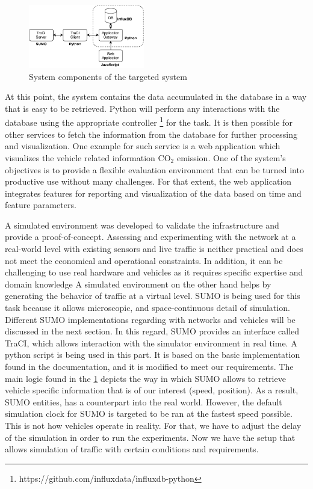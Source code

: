 \documentclass[letter, 10pt, conference]{ieeeconf}
\begin{document}
\begin{figure}[h]
  \centering
  \includegraphics[width=0.45\textwidth]{diagram2}
  \caption{System components of the targeted system}
  \label{fig:diagram2}
\end{figure}

At this point, the system contains the data accumulated in the database in a way that is easy to be retrieved.
Python will perform any interactions with the database using the appropriate controller \footnote{https://github.com/influxdata/influxdb-python} for the task.
It is then possible for other services to fetch the information from the database for further processing and visualization.
One example for such service is a web application which visualizes the vehicle related information CO$_2$ emission.
One of the system's objectives is to provide a flexible evaluation environment that can be turned into productive use without many challenges.
For that extent, the web application integrates features for reporting and visualization of the data based on time and feature parameters.

A simulated environment was developed to validate the infrastructure and provide a proof-of-concept.
Assessing and experimenting with the network at a real-world level with existing sensors and live traffic is neither practical and does not meet the economical and operational constraints.
In addition, it can be challenging to use real hardware and vehicles as it requires specific expertise and domain knowledge
A simulated environment on the other hand helps by generating the behavior of traffic at a virtual level.
SUMO is being used for this task because it allows microscopic, and space-continuous detail of simulation.
Different SUMO implementations regarding with networks and vehicles will be discussed in the next section.
In this regard, SUMO provides an interface called TraCI, which allows interaction with the simulator environment in real time.
A python script is being used in this part.
It is based on the basic implementation found in the documentation, and it is modified to meet our requirements.
The main logic found in the \ref{fig:diagram2} depicts the way in which SUMO allows to retrieve vehicle specific information that is of our interest (speed, position).
As a result, SUMO entities, has a counterpart into the real world.
However, the default simulation clock for SUMO is targeted to be ran at the fastest speed possible.
This is not how vehicles operate in reality.
For that, we have to adjust the delay of the simulation in order to run the experiments.
Now we have the setup that allows simulation of traffic with certain conditions and requirements.
\end{document}
